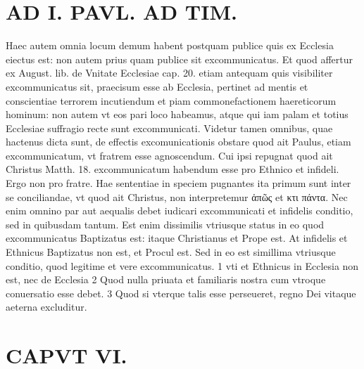 \documentclass{article}
\begin{document}
\begin{pages}
\section*{AD I. PAVL. AD TIM. }
\marginpar{[ p.Reo. ]}\pstart Haec autem omnia locum demum habent postquam publice quis ex Ecclesia eiectus est: non autem prius quam publice sit excommunicatus. Et quod affertur ex August. lib.  de Vnitate Ecclesiae cap. 20. etiam antequam quis visibiliter excommunicatus sit, praecisum esse ab Ecclesia, pertinet ad mentis et conscientiae terrorem incutiendum et piam commonefactionem haereticorum hominum: non autem vt eos pari loco habeamus, atque qui iam palam et totius Ecclesiae suffragio recte sunt excommunicati. Videtur tamen omnibus, quae hactenus dicta sunt, de effectis excomunicationis obstare quod ait Paulus, etiam excommunicatum, vt fratrem esse agnoscendum. Cui ipsi repugnat quod ait Christus Matth. 18. excommunicatum habendum esse pro Ethnico et infideli. Ergo non pro fratre. Hae sententiae in speciem pugnantes ita primum sunt inter se conciliandae, vt quod ait Christus, non interpretemur ἀπῶς et κτι πάντα. Nec enim omnino par aut aequalis debet iudicari excommunicati et infidelis conditio, sed in quibusdam tantum. Est enim dissimilis vtriusque status in eo quod excommunicatus Baptizatus est: itaque Christianus et Prope est. At infidelis et Ethnicus Baptizatus non est, et Procul est. Sed in eo est simillima vtriusque conditio, quod legitime et vere excommunicatus. 1 vti et Ethnicus in Ecclesia non est, nec de Ecclesia 2 Quod nulla priuata et familiaris nostra cum vtroque conuersatio esse debet. 3 Quod si vterque talis esse perseueret, regno Dei vitaque aeterna excluditur.  \pend
\section{CAPVT  VI. }
\marginpar{[ p.409 ]}\pstart {}
{}

\end{pages}
\end{document}
